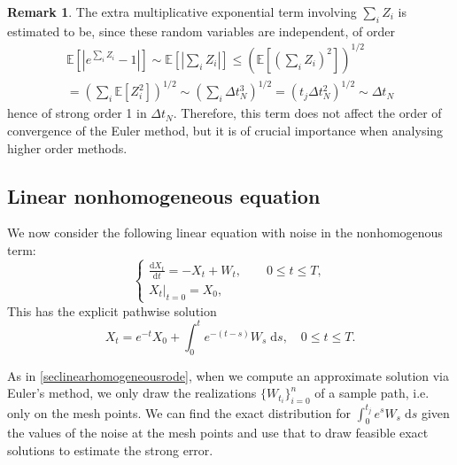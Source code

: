 \documentclass[reqno,12pt]{amsart}
\theoremstyle{plain}%
\theoremstyle{definition}
\newtheorem{rmk}{Remark}[section]
\begin{document}
\begin{rmk}
The extra multiplicative exponential term involving $\sum_i Z_i$ is estimated to be, since these random variables are independent, of order 
\begin{multline*}
    \mathbb{E}\left[\left|e^{\sum_i Z_i} - 1\right|\right] \sim \mathbb{E}\left[\left|\sum_i Z_i\right|\right] \leq \left(\mathbb{E}\left[\left(\sum_i Z_i\right)^2\right]\right)^{1/2} \\
    = \left(\sum_i \mathbb{E}\left[Z_i^2\right]\right)^{1/2} \sim \left(\sum_i \Delta t_N^3 \right)^{1/2} = \left(t_j \Delta t_N^2\right)^{1/2} \sim \Delta t_N
\end{multline*}
hence of strong order 1 in $\Delta t_N$. Therefore, this term does not affect the order of convergence of the Euler method, but it is of crucial importance when analysing higher order methods.
\end{rmk}

\subsection{Linear nonhomogeneous equation}

We now consider the following linear equation with noise in the nonhomogenous term:
\begin{equation}
    \label{linearnonhomogeneousrode}
    \begin{cases}
        \displaystyle \frac{\mathrm{d}X_t}{\mathrm{d} t} = -X_t + W_t, \qquad 0 \leq t \leq T, \\
        \left. X_t \right|_{t = 0} = X_0,
      \end{cases}
\end{equation}
This has the explicit pathwise solution
\begin{equation}
    X_t = e^{-t}X_0 + \int_0^t e^{-(t-s)}W_s\;\mathrm{d}s, \quad 0 \leq t \leq T.
\end{equation}

As in \cref{seclinearhomogeneousrode}, when we compute an approximate solution via Euler's method, we only draw the realizations $\{W_{t_i}\}_{i=0}^n$ of a sample path, i.e. only on the mesh points. We can find the exact distribution for $\int_0^{t_j} e^{s} W_s\;\mathrm{d}s$ given the values of the noise at the mesh points and use that to draw feasible exact solutions to estimate the strong error.
\end{document}
